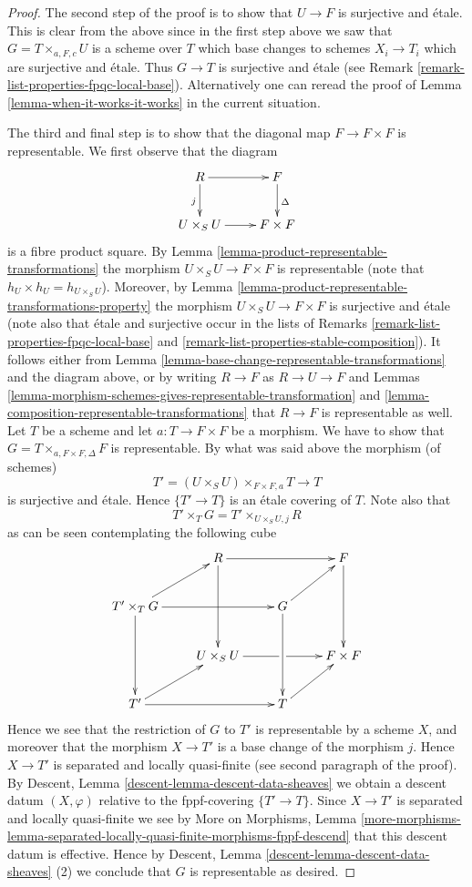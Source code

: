 \documentclass[10pt,a4paper]{amsart}
\theoremstyle{plain}
\theoremstyle{definition}
\theoremstyle{remark}
\numberwithin{equation}{subsection}
\begin{document}
\begin{proof}
\medskip\noindent
The second step of the proof is to show that $U \to F$ is surjective and
\'etale. This is clear from the above since in the first step above we
saw that $G = T \times_{a, F, c} U$ is a scheme over $T$ which base changes
to schemes $X_i \to T_i$ which are surjective and \'etale. Thus $G \to T$
is surjective and \'etale (see
Remark \ref{remark-list-properties-fpqc-local-base}).
Alternatively one can reread the proof of
Lemma \ref{lemma-when-it-works-it-works} in the current
situation.

\medskip\noindent
The third and final step is to show that the diagonal map $F \to F \times F$
is representable. We first observe that the diagram
$$
\xymatrix{
R \ar[r] \ar[d]_j & F \ar[d]^\Delta \\
U \times_S U \ar[r] & F \times F
}
$$
is a fibre product square. By
Lemma \ref{lemma-product-representable-transformations} the morphism
$U \times_S U \to F \times F$ is representable (note that
$h_U \times h_U = h_{U \times_S U}$). Moreover, by
Lemma \ref{lemma-product-representable-transformations-property}
the morphism $U \times_S U \to F \times F$ is surjective
and \'etale (note also that \'etale and surjective occur in the lists of
Remarks \ref{remark-list-properties-fpqc-local-base}
and \ref{remark-list-properties-stable-composition}).
It follows either from
Lemma \ref{lemma-base-change-representable-transformations}
and the diagram above, or by writing $R \to F$ as $R \to U \to F$ and
Lemmas
\ref{lemma-morphism-schemes-gives-representable-transformation} and
\ref{lemma-composition-representable-transformations} that
$R \to F$ is representable as well. Let $T$ be a scheme and let
$a : T \to F \times F$ be a morphism. We have to show that
$G = T \times_{a, F \times F, \Delta} F$ is representable.
By what was said above the morphism (of schemes)
$$
T' = (U \times_S U) \times_{F \times F, a} T \longrightarrow T
$$
is surjective and \'etale. Hence $\{T' \to T\}$ is an \'etale
covering of $T$. Note also that
$$
T' \times_T G = T' \times_{U \times_S U, j} R
$$
as can be seen contemplating the following cube
$$
\xymatrix{
& R \ar[rr] \ar[dd] & & F \ar[dd] \\
T' \times_T G \ar[rr] \ar[dd] \ar[ru] & & G \ar[dd] \ar[ru] & \\
& U \times_S U \ar'[r][rr] & & F \times F \\
T' \ar[rr] \ar[ru] & & T \ar[ru]
}
$$
Hence we see that the restriction of $G$ to $T'$ is representable
by a scheme $X$, and moreover that the morphism $X \to T'$ is
a base change of the morphism $j$. Hence $X \to T'$ is
separated and locally quasi-finite (see second paragraph of the proof).
By Descent, Lemma \ref{descent-lemma-descent-data-sheaves}
we obtain a descent datum $(X, \varphi)$ relative
to the fppf-covering $\{T' \to T\}$. Since
$X \to T'$ is separated and locally quasi-finite we see by
More on Morphisms, Lemma
\ref{more-morphisms-lemma-separated-locally-quasi-finite-morphisms-fppf-descend}
that this descent datum is effective.
Hence by
Descent, Lemma \ref{descent-lemma-descent-data-sheaves} (2)
we conclude that $G$ is representable as desired.
\end{proof}
\end{document}
